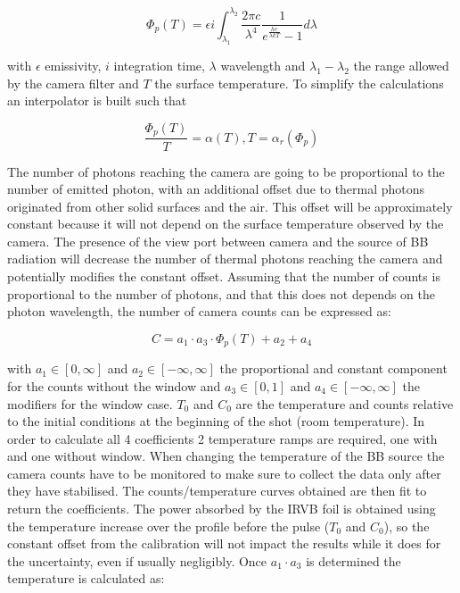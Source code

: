 \begin{equation}
{\Phi}_p (T) = \epsilon i \int_{ {\lambda}_1 }^{ {\lambda}_2 } {\frac{2 \pi c } { {\lambda}^4 } \frac {1} { e^{\frac {hc} {\lambda k T}} -1} {d \lambda} }
\label{eq:BBphotons1}
\end{equation}

with $\epsilon$ emissivity, $i$ integration time, $\lambda$ wavelength and $\lambda_1-\lambda_2$ the range allowed by the camera filter and $T$ the surface temperature.
To simplify the calculations an interpolator is built such that

\begin{equation}
\frac {{\Phi}_p (T)} {T} = \alpha (T) , T = {\alpha}_r ({\Phi}_p)
\label{eq:BBphotons2}
\end{equation}

The number of photons reaching the camera are going to be proportional to the number of emitted photon, with an additional offset due to thermal photons originated from other solid surfaces and the air. This offset will be approximately constant because it will not depend on the surface temperature observed by the camera.
The presence of the view port between camera and the source of BB radiation will decrease the number of thermal photons reaching the camera and potentially modifies the constant offset.
Assuming that the number of counts is proportional to the number of photons, and that this does not depends on the photon wavelength, the number of camera counts can be expressed as:

\begin{equation}
C = a_1 \cdot a_3 \cdot {\Phi}_p (T) + a_2 + a_4
\label{eq:BBphotons3}
\end{equation}

with $a_1\in[0,\infty]$ and $a_2\in[-\infty,\infty]$ the proportional and constant component for the counts without the window and $a_3\in[0,1]$ and $a_4\in[-\infty,\infty]$ the modifiers for the window case. $T_0$ and $C_0$ are the temperature and counts relative to the initial conditions at the beginning of the shot (room temperature).
In order to calculate all 4 coefficients 2 temperature ramps are required, one with and one without window. When changing the temperature of the BB source the camera counts have to be monitored to make sure to collect the data only after they have stabilised.
The counts/temperature curves obtained are then fit to return the coefficients. The power absorbed by the IRVB foil is obtained using the temperature increase over the profile before the pulse ($T_0$ and $C_0$), so the constant offset from the calibration will not impact the results while it does for the uncertainty, even if usually negligibly.
Once $a_1 \cdot a_3$ is determined the temperature is calculated as:

